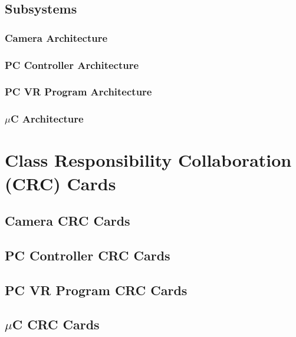 \documentclass[titlepage]{article}
\begin{document}
\subsection{Subsystems}
\subsubsection{Camera Architecture}
\subsubsection{PC Controller Architecture}
\subsubsection{PC VR Program Architecture}
\subsubsection{$\mu$C Architecture}


\section{Class Responsibility Collaboration (CRC) Cards}
\subsection{Camera CRC Cards}
\subsection{PC Controller CRC Cards}
\subsection{PC VR Program CRC Cards}
\subsection{$\mu$C CRC Cards}


\pagebreak
\printindex
\end{document}
